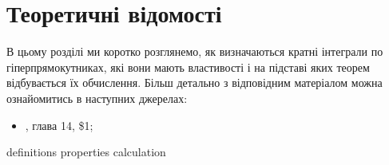 \chapter{Теоретичні відомості}
В цьому розділі ми коротко розглянемо, як визначаються кратні інтеграли по гіперпрямокутниках, які вони мають властивості і на підставі яких теорем відбувається їх обчислення. Більш детально з відповідним матеріалом можна ознайомитись в наступних джерелах:
\begin{itemize}
\item \cite{Dor94v2}, глава 14, \$1;
\end{itemize}

{definitions}
{properties}
{calculation}
